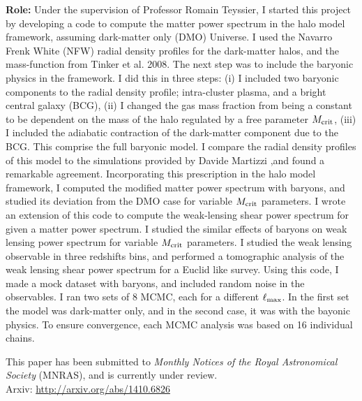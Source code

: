 {\bf Role:} Under the supervision of Professor Romain Teyssier, I started
this project by developing a code to compute the matter power spectrum
in the halo model framework, assuming dark-matter only (DMO) Universe. 
I used the Navarro Frenk White (NFW) radial density profiles for the 
dark-matter halos, and the mass-function from 
Tinker et al. 2008. The next step was to include the baryonic
physics in the framework. 
I did this in three steps: (i) I included two baryonic components
to the radial density profile; intra-cluster plasma, 
and a bright central galaxy (BCG), (ii) I changed 
the gas mass fraction from being a constant to be dependent on the mass
of the halo regulated by a free parameter $M_{\rm crit}$, (iii)
I included the adiabatic contraction of the dark-matter component
due to the BCG. This comprise the full baryonic
model. I compare the radial density profiles of this model
to the simulations provided by Davide Martizzi ,and found 
a remarkable agreement. 
Incorporating this prescription in the halo model framework, I computed
the modified matter power spectrum with baryons, and studied its
deviation from the DMO case for variable 
$M_{\rm crit}$ parameters.  
I wrote an extension of this code to compute the weak-lensing
shear power spectrum for given a matter power spectrum. I studied
the similar effects of baryons on weak lensing power spectrum
for variable $M_{\rm crit}$ parameters. I studied the weak lensing
observable in three redshifts bins, and performed a tomographic 
analysis of the weak lensing shear power spectrum for a Euclid like
survey. Using this code, I made a mock dataset with baryons, and included
random noise in the observables.
I ran two sets of 8 MCMC, each for a different $\ell_{\rm max}$.
In the first
set the model was dark-matter only, and in the second case, it was
with the bayonic physics. 
To ensure convergence, each MCMC analysis was based on  
16 individual chains. 

This paper has been submitted to {\it Monthly Notices of the Royal Astronomical
Society} (MNRAS), and is currently under review.
\\
Arxiv: \url{http://arxiv.org/abs/1410.6826}

\clearpage
